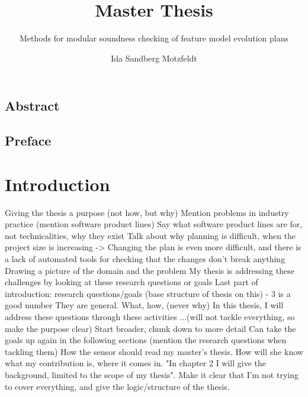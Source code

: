 \documentclass[a4paper,english]{ifimaster}
\title{Master Thesis}
\subtitle{Methods for modular soundness checking of feature model evolution plans}
\author{Ida Sandberg Motzfeldt}
\begin{document}
\duoforside[dept={Department of Informatics},
program={Informatics: Programming and System Architecture},
            option={Software},
long]

\frontmatter{}
\chapter*{Abstract}

\tableofcontents{}
\listoffigures{}
\listoftables{}

\chapter*{Preface}

\mainmatter{}
\part{Introduction}

Giving the thesis a purpose (not how, but why)
  Mention problems in industry practice (mention software product lines)
  Say what software product lines are for, not technicalities, why they exist
  Talk about why planning is difficult, when the project size is increasing
  -> Changing the plan is even more difficult, and there is a lack of automated tools for checking that the changes don't break anything
  Drawing a picture of the domain and the problem
  My thesis is addressing these challenges by looking at these research questions or goals
Last part of introduction: research questions/goals (base structure of thesis on this) - 3 is a good number
They are general. What, how, (never why)
In this thesis, I will address these questions through these activities ...(will not tackle everything, so make the purpose clear)
Start broader, chunk down to more detail
Can take the goals up again in the following sections (mention the research questions when tackling them)
How the sensor should read my master's thesis. How will she know what my contribution is, where it comes in. "In chapter 2 I will give the background, limited to the scope of my thesis". Make it clear that I'm not trying to cover everything, and give the logic/structure of the thesis.

\end{document}
